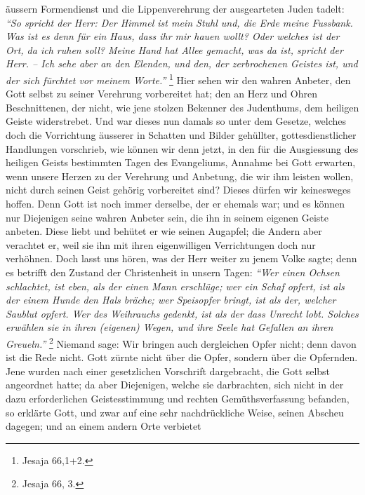 äussern Formendienst und
die Lippenverehrung der ausgearteten Juden tadelt:
\textit{"`So spricht der Herr: Der
Himmel ist mein Stuhl und, die Erde meine Fussbank. Was ist es denn für ein
Haus, dass ihr mir hauen wollt? Oder welches ist der Ort, da ich ruhen soll?
Meine Hand hat Allee gemacht, was da ist, spricht der Herr. -- Ich sehe aber an
den Elenden, und den, der zerbrochenen Geistes ist, und der sich fürchtet vor
meinem Worte."'}
\footnote{Jesaja 66,1+2.}
Hier sehen wir den wahren Anbeter, den
Gott selbst zu seiner Verehrung vorbereitet hat; den an Herz und Ohren
Beschnittenen, der nicht, wie jene stolzen Bekenner des
Judenthums, dem
heiligen Geiste widerstrebet. Und war dieses nun damals
so unter dem Gesetze, welches doch die Vorrichtung äusserer
in Schatten und
Bilder gehüllter, gottesdienstlicher Handlungen vorschrieb, wie können wir denn
jetzt, in den für die Ausgiessung des heiligen Geists bestimmten Tagen des
Evangeliums, Annahme bei Gott erwarten, wenn unsere Herzen
zu der Verehrung und
Anbetung, die wir ihm leisten wollen, nicht durch seinen Geist gehörig
vorbereitet sind? Dieses dürfen wir keinesweges hoffen. Denn Gott ist noch immer
derselbe, der er ehemals war; und es können nur
Diejenigen seine wahren Anbeter sein, die ihn in seinem
eigenen Geiste anbeten.
Diese liebt und behütet er wie seinen Augapfel; die Andern aber verachtet er,
weil sie ihn mit ihren eigenwilligen Verrichtungen doch nur verhöhnen. Doch
lasst uns hören, was der Herr weiter zu jenem Volke sagte; denn es betrifft den
Zustand der Christenheit in unsern Tagen:
\textit{"`Wer einen Ochsen schlachtet, ist
eben, als der einen Mann erschlüge; wer ein Schaf opfert, ist als der einem
Hunde den Hals bräche; wer Speisopfer bringt, ist als der, welcher Saublut
opfert. Wer des Weihrauchs gedenkt, ist als der
dass Unrecht lobt. Solches erwählen sie in ihren (eigenen) Wegen, und ihre Seele
hat Gefallen an ihren Greueln."'}
\footnote{Jesaja 66, 3.}
Niemand sage: Wir bringen
auch dergleichen Opfer nicht; denn davon ist die Rede nicht. Gott zürnte nicht
über die Opfer, sondern über die Opfernden. Jene wurden nach einer gesetzlichen
Vorschrift dargebracht, die Gott selbst angeordnet hatte; da aber Diejenigen,
welche sie darbrachten, sich nicht in der dazu erforderlichen Geistesstimmung
und rechten Gemüthsverfassung befanden, so erklärte Gott, und zwar auf eine sehr
nachdrückliche Weise, seinen Abscheu dagegen; und an einem andern Orte verbietet
